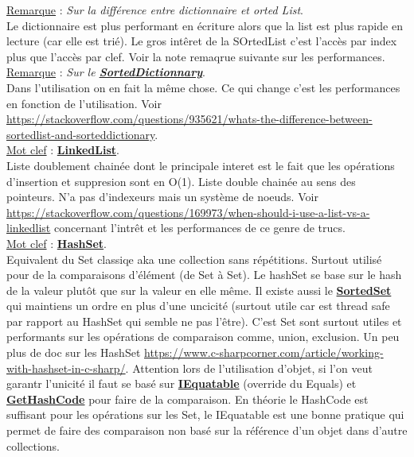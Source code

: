 \documentclass[a4paper,12pt,twoside]{article}
\newcommand{\urlcolor}{magenta}  %
\newcommand{\keycolor}{purple} %
\newcommand{\rem}[2]{\noindent\underline{Remarque} : \textit{#1}.\\ \indent #2}
\newcommand{\keyref}[2]{\hypersetup{urlcolor=\keycolor} \href{#1}{\textbf{#2}}\hypersetup{urlcolor=\urlcolor}}
\newcommand{\keyword}[3]{\noindent\underline{Mot clef} : \keyref{#1}{#2}. \\ \indent #3}
\begin{document}
\rem{Sur la différence entre dictionnaire et orted List}{Le dictionnaire est plus performant en écriture alors que la list est plus rapide en lecture (car elle est trié). Le gros intêret de la SOrtedList c'est l'accès par index plus que l'accès par clef. Voir la note remaqrue suivante sur les performances.}\\

\rem{Sur le \keyref{https://docs.microsoft.com/fr-fr/dotnet/api/system.collections.generic.sorteddictionary-2?view=net-6.0}{SortedDictionnary}}{Dans l'utilisation on en fait la même chose. Ce qui change c'est les performances en fonction de l'utilisation. Voir \url{https://stackoverflow.com/questions/935621/whats-the-difference-between-sortedlist-and-sorteddictionary}.}\\

\keyword{https://docs.microsoft.com/fr-fr/dotnet/api/system.collections.generic.linkedlist-1?view=net-6.0}{LinkedList}{Liste doublement chainée dont le principale interet est le fait que les opérations d'insertion et suppresion sont en O(1). Liste double chainée au sens des pointeurs. N'a pas d'indexeurs mais un système de noeuds. Voir \url{https://stackoverflow.com/questions/169973/when-should-i-use-a-list-vs-a-linkedlist} concernant l'intrêt et les performances de ce genre de trucs.}\\

\keyword{https://docs.microsoft.com/fr-fr/dotnet/api/system.collections.generic.hashset-1?view=net-6.0}{HashSet}{Equivalent du Set classiqe aka une collection sans répétitions. Surtout utilisé pour de la comparaisons d'élément (de Set à Set). Le hashSet se base sur le hash de la valeur plutôt que sur la valeur en elle même. Il existe aussi le \keyref{https://docs.microsoft.com/en-us/dotnet/api/system.collections.generic.sortedset-1?redirectedfrom=MSDN&view=net-6.0}{SortedSet} qui maintiens un ordre en plus d'une uncicité (surtout utile car est thread safe par rapport au HashSet qui semble ne pas l'être). C'est Set sont surtout utiles et performants sur les opérations de comparaison comme, union, exclusion. Un peu plus de doc sur les HashSet \url{https://www.c-sharpcorner.com/article/working-with-hashset-in-c-sharp/}. Attention lors de l'utilisation d'objet, si l'on veut garantr l'unicité il faut se basé sur \keyref{https://docs.microsoft.com/fr-fr/dotnet/api/system.iequatable-1?view=net-6.0}{IEquatable} (override du Equals) et \keyref{https://docs.microsoft.com/fr-fr/dotnet/api/system.object.gethashcode?view=net-6.0}{GetHashCode} pour faire de la comparaison. En théorie le HashCode est suffisant pour les opérations sur les Set, le IEquatable est une bonne pratique qui permet de faire des comparaison non basé sur la référence d'un objet dans d'autre collections.}\\
\end{document}
